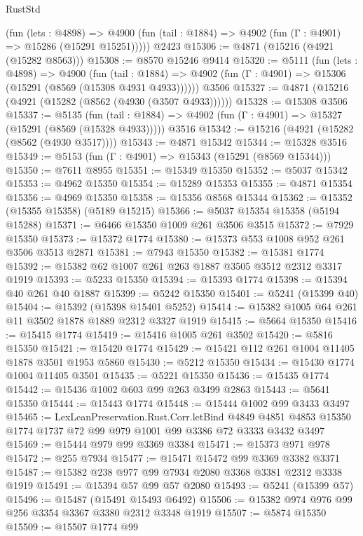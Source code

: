 \begin{lexlean}{RustStd}
\begin{coremodule}
{\begin{coremodule}
{{{{{{{{{{{{{{{{{{{{{{{{{{{{{      (fun (lets : @4898) =>
      @4900 (fun (tail : @1884) => @4902 (fun (Γ : @4901) => @15286 (@15291 @15251)))))
    @2423
@15306 := @4871 (@15216 (@4921 (@15282 @8563)))
@15308 := @8570 @15246 @9414
@15320 := @5111
    (fun (lets : @4898) =>
    @4900
      (fun (tail : @1884) =>
      @4902 (fun (Γ : @4901) => @15306 (@15291 (@8569 (@15308 @4931 @4933))))))
    @3506
@15327 := @4871 (@15216 (@4921 (@15282 (@8562 (@4930 (@3507 @4933))))))
@15328 := @15308 @3506
@15337 := @5135
    (fun (tail : @1884) => @4902 (fun (Γ : @4901) => @15327 (@15291 (@8569 (@15328 @4933)))))
    @3516
@15342 := @15216 (@4921 (@15282 (@8562 (@4930 @3517))))
@15343 := @4871 @15342
@15344 := @15328 @3516
@15349 := @5153 (fun (Γ : @4901) => @15343 (@15291 (@8569 @15344)))
@15350 := @7611 @8955
@15351 := @15349 @15350
@15352 := @5037 @15342
@15353 := @4962 @15350
@15354 := @15289 @15353
@15355 := @4871 @15354
@15356 := @4969 @15350
@15358 := @15356 @8568 @15344
@15362 := @15352 (@15355 @15358) (@5189 @15215)
@15366 := @5037 @15354 @15358 (@5194 @15288)
@15371 := @6466 @15350 @1009 @261 @3506 @3515
@15372 := @7929 @15350
@15373 := @15372 @1774
@15380 := @15373 @553 @1008 @952 @261 @3506 @3513 @2871
@15381 := @7943 @15350
@15382 := @15381 @1774
@15392 := @15382 @62 @1007 @261 @263 @1887 @3505 @3512 @2312 @3317 @1919
@15393 := @5233 @15350
@15394 := @15393 @1774
@15398 := @15394 @40 @261 @40 @1887
@15399 := @5242 @15350
@15401 := @5241 (@15399 @40)
@15404 := @15392 (@15398 @15401 @5252)
@15414 := @15382 @1005 @64 @261 @11 @3502 @1878 @1889 @2312 @3327 @1919
@15415 := @5664 @15350
@15416 := @15415 @1774
@15419 := @15416 @1005 @261 @3502
@15420 := @5816 @15350
@15421 := @15420 @1774
@15429 := @15421 @112 @261 @1004 @11405 @1878 @3501 @1953 @5860
@15430 := @5212 @15350
@15434 := @15430 @1774 @1004 @11405 @3501
@15435 := @5221 @15350
@15436 := @15435 @1774
@15442 := @15436 @1002 @603 @99 @263 @3499 @2863
@15443 := @5641 @15350
@15444 := @15443 @1774
@15448 := @15444 @1002 @99 @3433 @3497
@15465 := LexLeanPreservation.Rust.Corr.letBind
    @4849
    @4851
    @4853
    @15350
    @1774
    @1737
    @72
    @99
    @979
    @1001
    @99
    @3386
    @72
    @3333
    @3432
    @3497
@15469 := @15444 @979 @99 @3369 @3384
@15471 := @15373 @971 @978
@15472 := @255 @7934
@15477 := @15471 @15472 @99 @3369 @3382 @3371
@15487 := @15382 @238 @977 @99 @7934 @2080 @3368 @3381 @2312 @3338 @1919
@15491 := @15394 @57 @99 @57 @2080
@15493 := @5241 (@15399 @57)
@15496 := @15487 (@15491 @15493 @6492)
@15506 := @15382 @974 @976 @99 @256 @3354 @3367 @3380 @2312 @3348 @1919
@15507 := @5874 @15350
@15509 := @15507 @1774 @99
}}}}}}}}}}}}}}}}}}}}}}}}}}}}}
\end{coremodule}}
\end{coremodule}
\end{lexlean}

